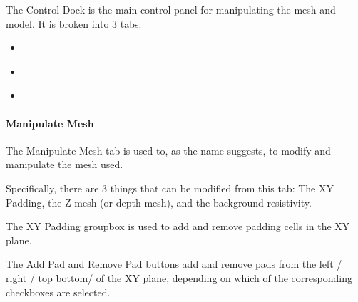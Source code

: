 \documentclass[letterpaper,10pt,english]{sphinxmanual}
\begin{document}
The Control Dock is the main control panel for manipulating the mesh and model. It is broken into 3 tabs:
\begin{itemize}
\item {} 
{\hyperref[\detokenize{content/mesh_designer/main_window:manipulate-mesh}]{}}

\item {} 
{\hyperref[\detokenize{content/mesh_designer/main_window:reset-mesh}]{}}

\item {} 
{\hyperref[\detokenize{content/mesh_designer/main_window:smoothing}]{}}

\end{itemize}


\paragraph{Manipulate Mesh}
\label{\detokenize{content/mesh_designer/main_window:manipulate-mesh}}
The Manipulate Mesh tab is used to, as the name suggests, to modify and manipulate the mesh used.

Specifically, there are 3 things that can be modified from this tab: The XY Padding, the Z mesh (or depth mesh), and the background resistivity.

The XY Padding groupbox is used to add and remove padding cells in the XY plane.

The Add Pad and Remove Pad buttons add and remove pads from the left / right / top bottom/ of the XY plane, depending on which of the corresponding checkboxes are selected.
\end{document}
